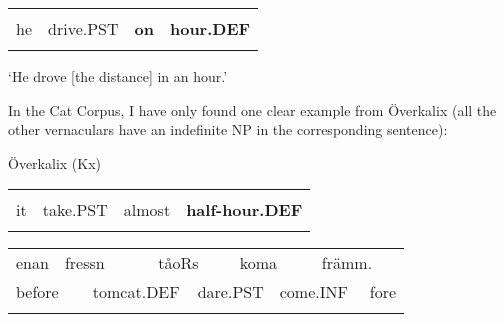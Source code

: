 \begin{tabular}{llll}
\lsptoprule
\multicolumn{4}{l}{Han

}\\
he & drive.PST & {\bfseries on} & {\bfseries hour.DEF}\\
\lspbottomrule
\end{tabular}

\begin{styleTranslation}
‘He drove [the distance] in an hour.’

\end{styleTranslation}

In the Cat Corpus, I have only found one clear example from Överkalix (all the other vernaculars have an indefinite NP in the corresponding sentence):


\begin{listWWNumileveli}
\item 

\begin{styleExample}
Överkalix (Kx) 

\end{styleExample}

\end{listWWNumileveli}

\begin{tabular}{llll}
\lsptoprule
\multicolumn{4}{l}{He

}\\
it & take.PST & almost & {\bfseries half-hour.DEF}\\
\lspbottomrule
\end{tabular}

\begin{tabular}{llllllllll}
\lsptoprule
enan & \multicolumn{2}{l}{fressn

} & \multicolumn{2}{l}{tåoRs

} & \multicolumn{2}{l}{koma

} & \multicolumn{2}{l}{främm.

} & \\
\multicolumn{2}{l}{before

} & \multicolumn{2}{l}{tomcat.DEF

} & \multicolumn{2}{l}{dare.PST

} & \multicolumn{2}{l}{come.INF

} & \multicolumn{2}{l}{fore

}\\
\lspbottomrule
\end{tabular}

